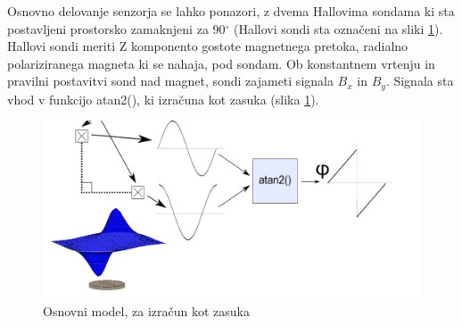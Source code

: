 Osnovno delovanje senzorja se lahko ponazori, z dvema Hallovima sondama ki sta postavljeni prostorsko zamaknjeni za 90$^\circ$ (Hallovi sondi sta označeni na sliki \ref{opis_modela}). Hallovi sondi meriti Z komponento gostote magnetnega pretoka, radialno polariziranega magneta ki se nahaja, pod sondam. Ob konstantnem vrtenju in pravilni postavitvi sond nad magnet, sondi zajameti signala $B_x$ in $B_y$. Signala sta vhod v funkcijo atan2(), ki izračuna kot zasuka (slika \ref{opis_modela}).

\begin{figure}[h]
	\centering
	\includegraphics[width=0.9\columnwidth]{./Slike/opis_modela.png}
	\caption{Osnovni model, za izračun kot zasuka}
	\label{opis_modela}
\end{figure}


%
%
%
%
%
